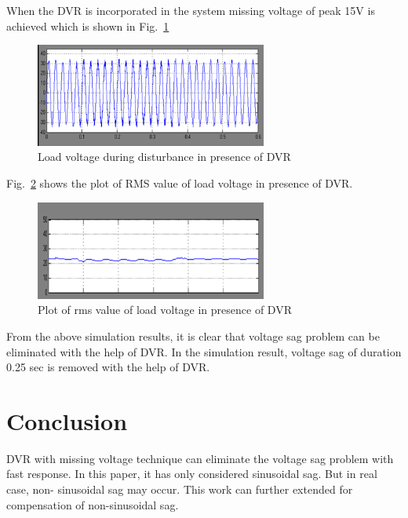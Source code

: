 \documentclass[journal,twoside]{IEEEtran}
\begin{document}
When the DVR is incorporated in the system missing
voltage of peak 15V is achieved which is shown in Fig.~\ref{f7}
\begin{figure}[!ht]
\centering
\includegraphics[width=3in]{7}
\caption{Load voltage during disturbance in presence of DVR}
\label{f7}
\end{figure}
Fig.~\ref{f8} shows the plot of RMS value of load voltage in
presence of DVR.

\begin{figure}[!ht]
\centering
\includegraphics[width=3in]{8}
\caption{Plot of rms value of load voltage in presence of DVR}
\label{f8}
\end{figure}


From the above simulation results, it is clear that voltage
sag problem can be eliminated with the help of DVR. In
the simulation result, voltage sag of duration 0.25 sec is
removed with the help of DVR.

	\section{Conclusion}

DVR with missing voltage technique can eliminate the
voltage sag problem with fast response. In this paper, it
has only considered sinusoidal sag. But in real case, non-
sinusoidal sag may occur. This work can further extended
for compensation of non-sinusoidal sag.
\end{document}
